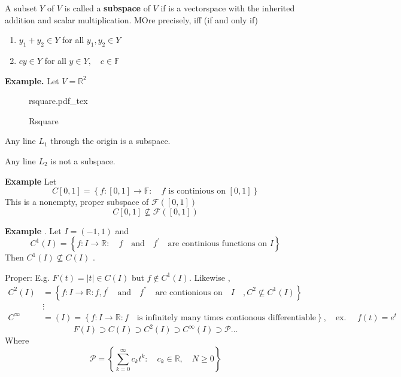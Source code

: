 \documentclass{article}
\newcommand{\incfig}[2][1]{%
\def\svgwidth{#1\columnwidth}
{#2.pdf_tex} } \pdfsuppresswarningpagegroup=1
\theoremstyle{remark}
\begin{document}
 \begin{definition}
   A subset $Y$ of $V$ is called a \textbf{subspace} of $V$ if is a vectorspace with the inherited addition and scalar multiplication. MOre precisely, iff (if and only if)
   \begin{enumerate}
     \item $y_{1} + y_{2} \in  Y$  for all $y _{1} , y_{2} \in  Y$
     \item $cy \in  Y$ for all $y \in  Y, \quad   c \in  \mathbb{F} $
   \end{enumerate}
 \end{definition}
   
   \textbf{Example.} Let $V = \mathbb{R} ^2$  
\begin{figure}[ht]
    \centering
    \incfig{rsquare}
    \caption{Rsquare}
    \label{fig:rsquare}
\end{figure}
Any line $L_{1}$ through the origin is a subspace. 

\newpara
Any line $L_{2}$ is not a subspace.


\newpara
\textbf{Example} 
Let  \[
C\left[ 0,1 \right] = \left\{ f: \left[ 0,1 \right] \to  \mathbb{F}  : \quad  f \text{ is continious on } \left[ 0,1 \right]  \right\}
\] 
This is a nonempty, proper subspace of $\mathcal{F}  \left( \left[ 0,1 \right] \right)$ \[
C\left[ 0,1 \right]\not \subseteq  \mathcal{F\left( \left[ 0,1 \right] \right)} 
\] 

\newpara
\textbf{Example} . Let $ I = \left( -1,1 \right)$ and \[
C^{1} \left( I \right) = \left\{ f: I \to  \mathbb{R}  : \quad f \quad \text{and} \quad f^{'} \quad \text{are continious functions on } I     \right\}
\] 
Then $C^{1} \left( I \right) \not \subseteq  C\left( I \right)$ .

\newpara
Proper: E.g. $F\left( t \right) = \left\lvert t \right\rvert  \in  C\left( I \right)$ but $f \not\in C^{1} \left( I \right)$. Likewise , \[
  \begin{split}
C^{2} \left( I \right)  & = \left\{ f: I \to  \mathbb{R}  : f , f^{'} \quad \text{and} \quad f^{''} \quad \text{are contionious on} \quad  I \quad , C^{2} \not \subseteq  C^{1} \left( I \right)      \right\} \\
  & \vdots \\
  C^{\infty}  & = \left( I \right) =  \left\{ f: I \to  \mathbb{R}  : f \quad  \text{is infinitely many times contionous differentiable}  \right\} , \quad \text{ex. } \quad  f\left( t \right) = e^{t}  
  \end{split} 
\] 
\[
  F\left( I \right)  \supset C\left( I \right) \supset C^{2} \left( I \right) \supset C^{\infty}\left( I \right) \supset  \mathcal{P}  \ldots 
\] 
Where \[
\mathcal{P}  = \left\{ \sum_{k=0}^{\infty}  c_{k} t^{k} : \quad  c_{k} \in  \mathbb{R}  , \quad  N \ge 0   \right\}
\] 
\end{document}
